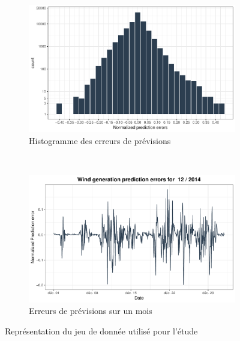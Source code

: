 \documentclass[12pt]{report}
\begin{document}
\begin{figure}[ht!]
	\begin{center}
		\begin{subfigure}[b]{0.45\textwidth}
			\includegraphics[width=\textwidth]{Images/Data/Eolien/BPA/Hist_NormErr.pdf}
			\caption{Histogramme des erreurs de prévisions}
			\label{fig::Data_Eolien_BPA_HistNormERR}
		\end{subfigure}
		~
		\begin{subfigure}[b]{0.45\textwidth}
			\includegraphics[width=\textwidth]{Images/Data/Eolien/BPA/NormWindErrs_1Month.pdf}
			\caption{Erreurs de prévisions sur un mois}
			\label{fig::Data_Eolien_BPA_NormWindErrs_1Month}
		\end{subfigure}
		\caption{Représentation du jeu de donnée utilisé pour l'étude}
		\label{fig::Data_BPA_HitsZoom}	
	\end{center}
\end{figure}
\end{document}
